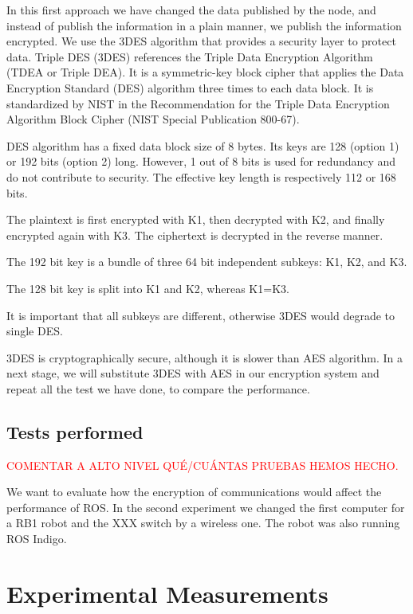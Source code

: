 \documentclass[journal,twoside]{JoPhA}
\begin{document}
In this first approach we have changed the data published by the node, and instead of publish the information in a plain manner, we publish the information encrypted. We use the 3DES algorithm that provides a security layer to protect data.
Triple DES (3DES) references the Triple Data Encryption Algorithm (TDEA or Triple DEA). It is a symmetric-key block cipher that applies the Data Encryption Standard (DES) algorithm three times to each data block. It is standardized by NIST in the Recommendation for the Triple Data Encryption Algorithm Block Cipher (NIST Special Publication 800-67).

DES algorithm has a fixed data block size of 8 bytes. Its keys are 128 (option 1) or 192 bits (option 2) long. However, 1 out of 8 bits is used for redundancy and do not contribute to security. The effective key length is respectively 112 or 168 bits.

The plaintext is first encrypted with K1, then decrypted with K2, and finally encrypted again with K3. The ciphertext is decrypted in the reverse manner.

The 192 bit key is a bundle of three 64 bit independent subkeys: K1, K2, and K3.

The 128 bit key is split into K1 and K2, whereas K1=K3.

It is important that all subkeys are different, otherwise 3DES would degrade to single DES.

3DES is cryptographically secure, although it is slower than AES algorithm. In a next stage, we will substitute 3DES with AES in our encryption system and repeat all the test we have done, to compare the performance.


\subsection{Tests performed}

\textcolor{red}{COMENTAR A ALTO NIVEL QU\'E/CU\'ANTAS PRUEBAS HEMOS HECHO.}

We want to evaluate how the encryption of communications would affect the performance of ROS.
In the second experiment we changed the first computer for a RB1 robot and the XXX switch by a wireless one. The robot was also running ROS Indigo.




\section{Experimental Measurements}
\end{document}
